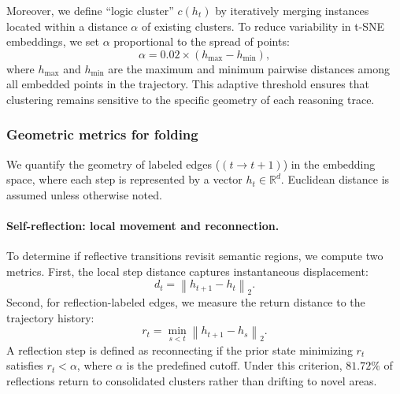 Moreover, we define ``logic cluster'' $c(h_t)$ by iteratively merging instances located within a distance $\alpha$ of existing clusters. To reduce variability in t-SNE embeddings, we set $\alpha$ proportional to the spread of points:
\begin{equation}
\alpha = 0.02 \times (h_{\max} - h_{\min}),
\end{equation}
where \(h_{\max}\) and \(h_{\min}\) are the maximum and minimum pairwise distances among all embedded points in the trajectory. This adaptive threshold ensures that clustering remains sensitive to the specific geometry of each reasoning trace.

\subsubsection{Geometric metrics for folding}
\label{app:folding-metrics}
We quantify the geometry of labeled edges (\((t \rightarrow t{+}1)\)) in the embedding space, where each step is represented by a vector \(h_t \in \mathbb{R}^d\). Euclidean distance is assumed unless otherwise noted.\vspace{-5pt}


\paragraph{\textbf{Self-reflection: local movement and reconnection.}}
To determine if reflective transitions revisit semantic regions, we compute two metrics. First, the {local step distance} captures instantaneous displacement:
\begin{equation}
d_t = \left\lVert h_{t+1} - h_t \right\rVert_2.
\end{equation}
Second, for reflection-labeled edges, we measure the {return distance} to the trajectory history:
\begin{equation}
r_t = \min_{s < t} \left\lVert h_{t+1} - h_s \right\rVert_2.
\end{equation}
A reflection step is defined as {reconnecting} if the prior state minimizing \(r_t\) satisfies \(r_t < \alpha\), where \(\alpha\) is the predefined cutoff. Under this criterion, \(81.72\%\) of reflections return to consolidated clusters rather than drifting to novel areas.\vspace{-5pt}


